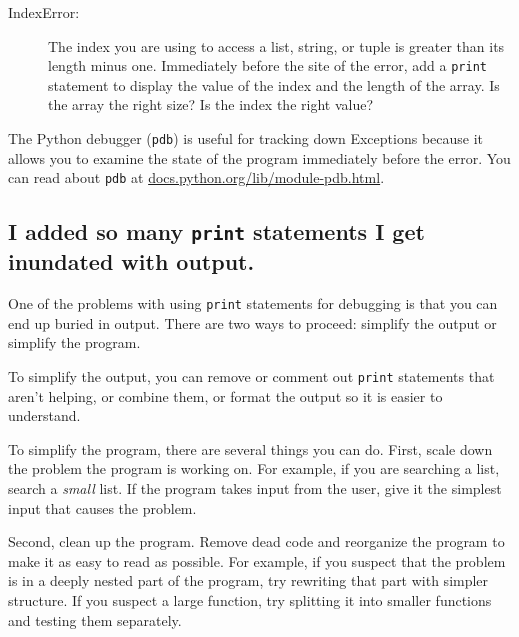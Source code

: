\documentclass[10pt]{book}
\begin{document}
\begin{description}

\item[IndexError:] The index you are using
to access a list, string, or tuple is greater than
its length minus one.  Immediately before the site of the error,
add a {\tt print} statement to display
the value of the index and the length of the array.
Is the array the right size?  Is the index the right value?


\end{description}


The Python debugger ({\tt pdb}) is useful for tracking down
Exceptions because it allows you to examine the state of the
program immediately before the error.  You can read
about {\tt pdb} at \url{docs.python.org/lib/module-pdb.html}.


\subsection{I added so many {\tt print} statements I get inundated with
output.}


One of the problems with using {\tt print} statements for debugging
is that you can end up buried in output.  There are two ways
to proceed: simplify the output or simplify the program.

To simplify the output, you can remove or comment out {\tt print}
statements that aren't helping, or combine them, or format
the output so it is easier to understand.

To simplify the program, there are several things you can do.  First,
scale down the problem the program is working on.  For example, if you
are searching a list, search a \emph{small} list.  If the program takes
input from the user, give it the simplest input that causes the
problem.


Second, clean up the program.  Remove dead code and reorganize the
program to make it as easy to read as possible.  For example, if you
suspect that the problem is in a deeply nested part of the program,
try rewriting that part with simpler structure.  If you suspect a
large function, try splitting it into smaller functions and testing them
separately.
\end{document}

